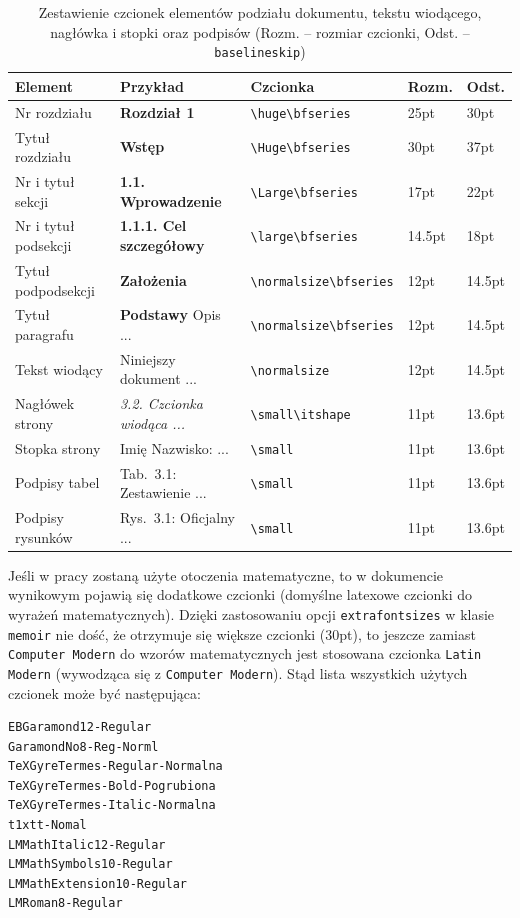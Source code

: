 \begin{table}[htb]
\centering
\caption{Zestawienie czcionek elementów podziału dokumentu, tekstu wiodącego, nagłówka i stopki oraz podpisów (Rozm. -- rozmiar czcionki, Odst. -- \texttt{baselineskip})}
\label{tab:secfonts}\small
\begin{tabularx}{\linewidth}{|ll@{\hskip 5pt}l@{\hskip 5pt}lX|} \hline
Element & Przykład & Czcionka & Rozm. & Odst. \\ \hline\hline
Nr rozdziału & {\huge\bfseries Rozdział 1 } & \verb?\huge\bfseries? & 25pt & 30pt \\
Tytuł rozdziału & {\Huge\bfseries Wstęp } & \verb?\Huge\bfseries? & 30pt & 37pt\\
Nr i tytuł sekcji & {\Large\bfseries 1.1. Wprowadzenie } & \verb?\Large\bfseries? & 17pt & 22pt \\
Nr i tytuł podsekcji & {\large\bfseries 1.1.1. Cel szczegółowy } & \verb?\large\bfseries? &14.5pt & 18pt\\
Tytuł podpodsekcji  & {\normalsize\bfseries Założenia } & \verb?\normalsize\bfseries? & 12pt & 14.5pt\\
Tytuł paragrafu & {\normalsize\bfseries  Podstawy } Opis ... &  \verb?\normalsize\bfseries? & 12pt & 14.5pt\\
Tekst wiodący & {\normalsize Niniejszy dokument ... } & \verb?\normalsize? & 12pt & 14.5pt\\
Nagłówek strony & {\small\itshape 3.2. Czcionka wiodąca ...} & \verb?\small\itshape? & 11pt & 13.6pt \\
Stopka strony & {\small Imię Nazwisko: ...} & \verb?\small? & 11pt & 13.6pt\\
Podpisy tabel & {\small Tab.~3.1: Zestawienie ...} & \verb?\small? & 11pt & 13.6pt \\
Podpisy rysunków & {\small Rys.~3.1: Oficjalny ...} & \verb?\small? & 11pt & 13.6pt\\\hline
\end{tabularx}
\end{table}

Jeśli w pracy zostaną użyte otoczenia matematyczne, to w dokumencie wynikowym pojawią się dodatkowe czcionki (domyślne latexowe czcionki do wyrażeń matematycznych). Dzięki zastosowaniu opcji \texttt{extrafontsizes} w klasie \texttt{memoir} nie dość, że otrzymuje się większe czcionki (30pt), to jeszcze zamiast \texttt{Computer Modern} do wzorów matematycznych jest stosowana czcionka \texttt{Latin Modern} (wywodząca się z \texttt{Computer Modern}).
Stąd lista wszystkich użytych czcionek może być następująca:
\begin{lstlisting}[basicstyle=\footnotesize\ttfamily]
EBGaramond12-Regular
GaramondNo8-Reg-Norml
TeXGyreTermes-Regular-Normalna
TeXGyreTermes-Bold-Pogrubiona
TeXGyreTermes-Italic-Normalna
t1xtt-Nomal
LMMathItalic12-Regular
LMMathSymbols10-Regular
LMMathExtension10-Regular
LMRoman8-Regular
\end{lstlisting}

